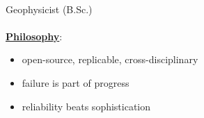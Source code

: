 \documentclass{article}
\begin{document}
\begin{mdframed}[backgroundcolor=anti-flashwhite]
	\begin{minipage}[t]{0.4\textwidth}
	{\fontsize{30pt}{62pt}\color{gray} }\\
    {\fontsize{14pt}{24pt}\color{pblue} \selectfont Geophysicist \color{lightgray} (B.Sc.)}\\\\
    \textbf{\underline{Philosophy}}:
    \begin{itemize}
    \item open-source, replicable, cross-disciplinary
    \item failure is part of progress
    \item reliability beats sophistication
    \end{itemize}
	\end{minipage}
	\hfill
	\vrule
	\hfill
	\begin{minipage}[t]{0.2\textwidth}
	\vspace{0cm}
\end{minipage}
\end{mdframed}
\end{document}
